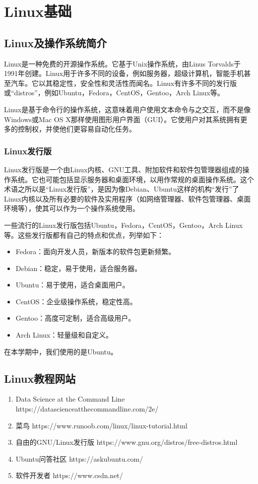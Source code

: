 \chapter{Linux基础}
\section{Linux及操作系统简介}

Linux是一种免费的开源操作系统。它基于Unix操作系统，由Linus Torvalds于1991年创建。Linux用于许多不同的设备，例如服务器，超级计算机，智能手机甚至汽车。它以其稳定性，安全性和灵活性而闻名。Linux有许多不同的发行版或“distros”，例如Ubuntu，Fedora，CentOS，Gentoo，Arch Linux等。

Linux是基于命令行的操作系统，这意味着用户使用文本命令与之交互，而不是像Windows或Mac OS X那样使用图形用户界面（GUI）。它使用户对其系统拥有更多的控制权，并使他们更容易自动化任务。

\subsection{Linux发行版}
Linux发行版是一个由Linux内核、GNU工具、附加软件和软件包管理器组成的操作系统。它也可能包括显示服务器和桌面环境，以用作常规的桌面操作系统。这个术语之所以是“Linux发行版”，是因为像Debian、Ubuntu这样的机构“发行”了Linux内核以及所有必要的软件及实用程序（如网络管理器、软件包管理器、桌面环境等），使其可以作为一个操作系统使用。

一些流行的Linux发行版包括Ubuntu，Fedora，CentOS，Gentoo，Arch Linux等。这些发行版都有自己的特点和优点，列举如下：
\begin{itemize}
    \item Fedora：面向开发人员，新版本的软件包更新频繁。
    \item Debian：稳定，易于使用，适合服务器。
    \item Ubuntu：易于使用，适合桌面用户。
    \item CentOS：企业级操作系统，稳定性高。
    \item Gentoo：高度可定制，适合高级用户。
    \item Arch Linux：轻量级和自定义。
\end{itemize}

在本学期中，我们使用的是Ubuntu。

\section{Linux教程网站}

\begin{enumerate}
    \item Data Science at the Command Line
          https://datascienceatthecommandline.com/2e/
    \item 菜鸟
          https://www.runoob.com/linux/linux-tutorial.html

    \item 自由的GNU/Linux发行版
          https://www.gnu.org/distros/free-distros.html
    \item Ubuntu问答社区
          https://askubuntu.com/
    \item 软件开发者
          https://www.csdn.net/
\end{enumerate}


